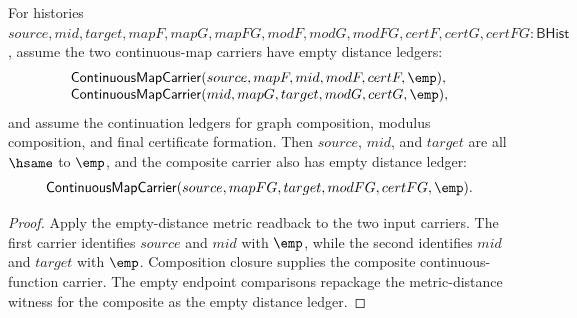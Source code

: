 \begin{theorem}
\label{thm:continuousmap-empty-distance-comp-closed}
For histories
$source,mid,target,mapF,mapG,mapFG,modF,modG,modFG,certF,certG,certFG:\mathsf{BHist}$,
assume the two continuous-map carriers have empty distance ledgers:
$$
\begin{array}{l}
\mathsf{ContinuousMapCarrier}(source,mapF,mid,modF,certF,\emp),\\
\mathsf{ContinuousMapCarrier}(mid,mapG,target,modG,certG,\emp),
\end{array}
$$
and assume the continuation ledgers for graph composition, modulus
composition, and final certificate formation. Then $source$, $mid$, and
$target$ are all $\hsame$ to $\emp$, and the composite carrier also has empty
distance ledger:
$$
\mathsf{ContinuousMapCarrier}(source,mapFG,target,modFG,certFG,\emp).
$$
\end{theorem}
\begin{proof}
Apply the empty-distance metric readback to the two input carriers. The first
carrier identifies $source$ and $mid$ with $\emp$, while the second identifies
$mid$ and $target$ with $\emp$. Composition closure supplies the composite
continuous-function carrier. The empty endpoint comparisons repackage the
metric-distance witness for the composite as the empty distance ledger.
\end{proof}

